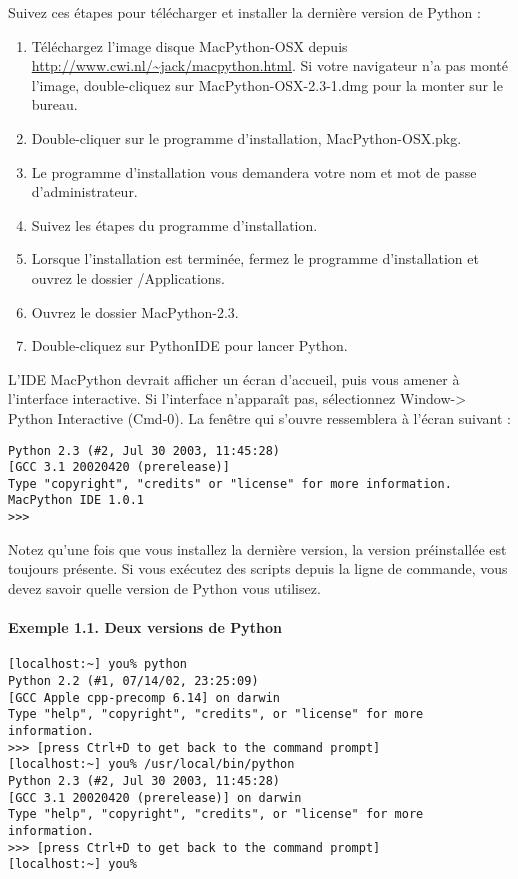Suivez ces étapes pour télécharger et installer la dernière version de Python :

\begin{enumerate}
    \item{Téléchargez l'image disque MacPython-OSX depuis \url{http://www.cwi.nl/~jack/macpython.html}. Si votre navigateur n'a pas monté l'image, double-cliquez sur MacPython-OSX-2.3-1.dmg pour la monter sur le bureau.}
    \item{Double-cliquer sur le programme d'installation, MacPython-OSX.pkg.}
    \item{Le programme d'installation vous demandera votre nom et mot de passe d'administrateur.}
    \item{Suivez les étapes du programme d'installation.}
    \item{Lorsque l'installation est terminée, fermez le programme d'installation et ouvrez le dossier /Applications.}
    \item{Ouvrez le dossier MacPython-2.3.}
    \item{Double-cliquez sur PythonIDE pour lancer Python.}
\end{enumerate}

\medskip
L'IDE MacPython devrait afficher un écran d'accueil, puis vous amener à l'interface interactive. Si l'interface n'apparaît pas, sélectionnez Window-> Python Interactive (Cmd-0). La fenêtre qui s'ouvre ressemblera à l'écran suivant :

\begin{lstlisting}
Python 2.3 (#2, Jul 30 2003, 11:45:28)
[GCC 3.1 20020420 (prerelease)]
Type "copyright", "credits" or "license" for more information.
MacPython IDE 1.0.1
>>>
\end{lstlisting}

Notez qu'une fois que vous installez la dernière version, la version préinstallée est toujours présente. Si vous exécutez des scripts depuis la ligne de commande, vous devez savoir quelle version de Python vous utilisez.

\paragraph*{Exemple 1.1. Deux versions de Python}
\begin{lstlisting}
[localhost:~] you% python
Python 2.2 (#1, 07/14/02, 23:25:09)
[GCC Apple cpp-precomp 6.14] on darwin
Type "help", "copyright", "credits", or "license" for more information.
>>> [press Ctrl+D to get back to the command prompt]
[localhost:~] you% /usr/local/bin/python
Python 2.3 (#2, Jul 30 2003, 11:45:28)
[GCC 3.1 20020420 (prerelease)] on darwin
Type "help", "copyright", "credits", or "license" for more information.
>>> [press Ctrl+D to get back to the command prompt]
[localhost:~] you%
\end{lstlisting}

